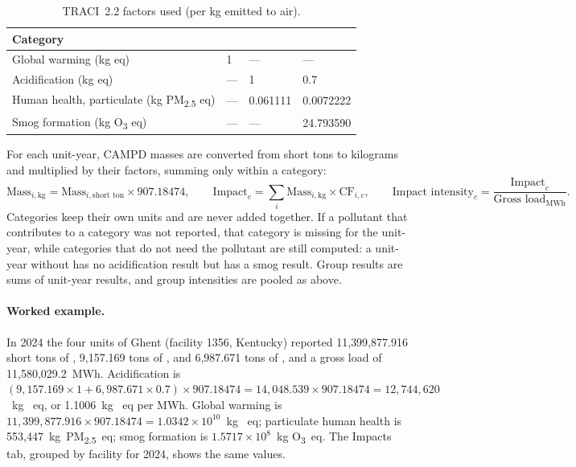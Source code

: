 \documentclass[11pt,a4paper]{article}
\newcommand{\PMtwofive}{PM\textsubscript{2.5}}
\begin{document}
\begin{table}[H]
  \centering\small
  \caption{TRACI~2.2 factors used (per kg emitted to air).}\label{tab:factors}
  \begin{tabular}{@{}llll@{}}
    \toprule
    \textbf{Category} & \textbf{\COtwo{}} & \textbf{\SOtwo{}} & \textbf{\NOx{}}\\
    \midrule
    Global warming (kg \COtwo{} eq) & 1 & --- & ---\\
    Acidification (kg \SOtwo{} eq) & --- & 1 & 0.7\\
    Human health, particulate (kg \PMtwofive{} eq) & --- & 0.061111 & 0.0072222\\
    Smog formation (kg O\textsubscript{3} eq) & --- & --- & 24.793590\\
    \bottomrule
  \end{tabular}
\end{table}

For each unit-year, CAMPD masses are converted from short tons to kilograms and multiplied by
their factors, summing only within a category:
\begin{equation}
  \text{Mass}_{i,\text{kg}} = \text{Mass}_{i,\text{short ton}} \times 907.18474, \qquad
  \text{Impact}_c = \sum_i \text{Mass}_{i,\text{kg}} \times \text{CF}_{i,c}, \qquad
  \text{Impact intensity}_c = \frac{\text{Impact}_c}{\text{Gross load}_{\text{MWh}}}.
\end{equation}
Categories keep their own units and are never added together. If a pollutant that contributes
to a category was not reported, that category is missing for the unit-year, while categories
that do not need the pollutant are still computed: a unit-year without \SOtwo{} has no
acidification result but has a smog result. Group results are sums of unit-year results, and
group intensities are pooled as above.

\paragraph{Worked example.} In 2024 the four units of Ghent (facility 1356, Kentucky) reported
11{,}399{,}877.916 short tons of \COtwo{}, 9{,}157.169 tons of \SOtwo{}, and 6{,}987.671 tons of
\NOx{}, and a gross load of 11{,}580{,}029.2~MWh. Acidification is $(9{,}157.169 \times 1 +
6{,}987.671 \times 0.7) \times 907.18474 = 14{,}048.539 \times 907.18474 = 12{,}744{,}620$~kg
\SOtwo{}~eq, or 1.1006~kg \SOtwo{}~eq per MWh. Global warming is $11{,}399{,}877.916 \times
907.18474 = 1.0342 \times 10^{10}$~kg \COtwo{}~eq; particulate human health is
553{,}447~kg~\PMtwofive{}~eq; smog formation is $1.5717 \times 10^{8}$~kg O\textsubscript{3}~eq.
The Impacts tab, grouped by facility for 2024, shows the same values.
\end{document}
